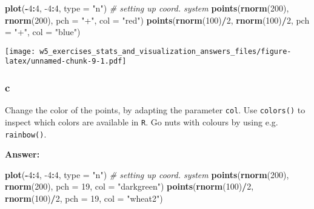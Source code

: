 \documentclass[]{article}
\newenvironment{Shaded}{\begin{snugshade}}{\end{snugshade}}
\newcommand{\CommentTok}[1]{\textcolor[rgb]{0.56,0.35,0.01}{\textit{#1}}}
\newcommand{\DataTypeTok}[1]{\textcolor[rgb]{0.13,0.29,0.53}{#1}}
\newcommand{\DecValTok}[1]{\textcolor[rgb]{0.00,0.00,0.81}{#1}}
\newcommand{\KeywordTok}[1]{\textcolor[rgb]{0.13,0.29,0.53}{\textbf{#1}}}
\newcommand{\NormalTok}[1]{#1}
\newcommand{\OperatorTok}[1]{\textcolor[rgb]{0.81,0.36,0.00}{\textbf{#1}}}
\newcommand{\StringTok}[1]{\textcolor[rgb]{0.31,0.60,0.02}{#1}}
\begin{document}
\begin{Shaded}
\begin{Highlighting}[]
\KeywordTok{plot}\NormalTok{(}\OperatorTok{-}\DecValTok{4}\OperatorTok{:}\DecValTok{4}\NormalTok{, }\DecValTok{-4}\OperatorTok{:}\DecValTok{4}\NormalTok{, }\DataTypeTok{type =} \StringTok{"n"}\NormalTok{)  }\CommentTok{# setting up coord. system}
\KeywordTok{points}\NormalTok{(}\KeywordTok{rnorm}\NormalTok{(}\DecValTok{200}\NormalTok{), }\KeywordTok{rnorm}\NormalTok{(}\DecValTok{200}\NormalTok{), }\DataTypeTok{pch =} \StringTok{"+"}\NormalTok{, }\DataTypeTok{col =} \StringTok{"red"}\NormalTok{)}
\KeywordTok{points}\NormalTok{(}\KeywordTok{rnorm}\NormalTok{(}\DecValTok{100}\NormalTok{)}\OperatorTok{/}\DecValTok{2}\NormalTok{, }\KeywordTok{rnorm}\NormalTok{(}\DecValTok{100}\NormalTok{)}\OperatorTok{/}\DecValTok{2}\NormalTok{, }\DataTypeTok{pch =} \StringTok{"+"}\NormalTok{, }\DataTypeTok{col =} \StringTok{"blue"}\NormalTok{)}
\end{Highlighting}
\end{Shaded}

\texttt{[image: w5\_exercises\_stats\_and\_visualization\_answers\_files/figure-latex/unnamed-chunk-9-1.pdf]}

\hypertarget{c-2}{%
\subsubsection{c}\label{c-2}}

Change the color of the points, by adapting the parameter \texttt{col}.
Use \texttt{colors()} to inspect which colors are available in
\texttt{R}. Go nuts with colours by using e.g. \texttt{rainbow()}.

\textbf{Answer:}

\begin{Shaded}
\begin{Highlighting}[]
\KeywordTok{plot}\NormalTok{(}\OperatorTok{-}\DecValTok{4}\OperatorTok{:}\DecValTok{4}\NormalTok{, }\DecValTok{-4}\OperatorTok{:}\DecValTok{4}\NormalTok{, }\DataTypeTok{type =} \StringTok{"n"}\NormalTok{)  }\CommentTok{# setting up coord. system}
\KeywordTok{points}\NormalTok{(}\KeywordTok{rnorm}\NormalTok{(}\DecValTok{200}\NormalTok{), }\KeywordTok{rnorm}\NormalTok{(}\DecValTok{200}\NormalTok{), }\DataTypeTok{pch =} \DecValTok{19}\NormalTok{, }\DataTypeTok{col =} \StringTok{"darkgreen"}\NormalTok{)}
\KeywordTok{points}\NormalTok{(}\KeywordTok{rnorm}\NormalTok{(}\DecValTok{100}\NormalTok{)}\OperatorTok{/}\DecValTok{2}\NormalTok{, }\KeywordTok{rnorm}\NormalTok{(}\DecValTok{100}\NormalTok{)}\OperatorTok{/}\DecValTok{2}\NormalTok{, }\DataTypeTok{pch =} \DecValTok{19}\NormalTok{, }\DataTypeTok{col =} \StringTok{"wheat2"}\NormalTok{)}
\end{Highlighting}
\end{Shaded}
\end{document}
